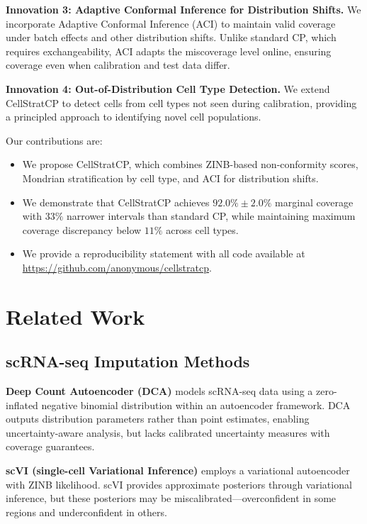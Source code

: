 \documentclass{article}
\begin{document}
\textbf{Innovation 3: Adaptive Conformal Inference for Distribution Shifts.} We incorporate Adaptive Conformal Inference (ACI) \citep{gibbs2021adaptive} to maintain valid coverage under batch effects and other distribution shifts. Unlike standard CP, which requires exchangeability, ACI adapts the miscoverage level online, ensuring coverage even when calibration and test data differ.

\textbf{Innovation 4: Out-of-Distribution Cell Type Detection.} We extend CellStratCP to detect cells from cell types not seen during calibration, providing a principled approach to identifying novel cell populations.

Our contributions are:
\begin{itemize}
    \item We propose CellStratCP, which combines ZINB-based non-conformity scores, Mondrian stratification by cell type, and ACI for distribution shifts.
    \item We demonstrate that CellStratCP achieves $92.0\% \pm 2.0\%$ marginal coverage with $33\%$ narrower intervals than standard CP, while maintaining maximum coverage discrepancy below $11\%$ across cell types.
    \item We provide a reproducibility statement with all code available at \url{https://github.com/anonymous/cellstratcp}.
\end{itemize}

\section{Related Work}

\subsection{scRNA-seq Imputation Methods}

\textbf{Deep Count Autoencoder (DCA)} \citep{eraslan2019single} models scRNA-seq data using a zero-inflated negative binomial distribution within an autoencoder framework. DCA outputs distribution parameters rather than point estimates, enabling uncertainty-aware analysis, but lacks calibrated uncertainty measures with coverage guarantees.

\textbf{scVI (single-cell Variational Inference)} \citep{lopez2018deep} employs a variational autoencoder with ZINB likelihood. scVI provides approximate posteriors through variational inference, but these posteriors may be miscalibrated---overconfident in some regions and underconfident in others.
\end{document}
